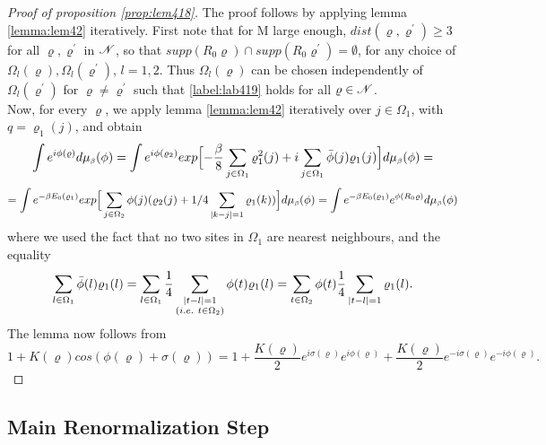 \documentclass[11pt,reqno]{article}
\DeclarePairedDelimiter\abs{\lvert}{\rvert}%
\theoremstyle{definition}
\numberwithin{equation}{section}
\begin{document}
\begin{proof}[Proof of proposition \eqref{prop:lem418}]
The proof follows by applying lemma \eqref{lemma:lem42} iteratively.
First note that for M large enough, $dist(\varrho, \varrho^\prime) \geq 3$ for all $\varrho, \varrho^\prime$ in $\mathscr{N}$, so that $supp(R_0\varrho) \cap supp(R_0\varrho^\prime) = \emptyset$, for any choice of $\Omega_l(\varrho), \Omega_l(\varrho^\prime)$, $l=1,2$. Thus $\Omega_l(\varrho)$ can be chosen independently of $\Omega_l(\varrho^\prime)$ for $\varrho \neq \varrho^\prime$ such that \eqref{label:lab419} holds for all $\varrho \in \mathscr{N}$.\\
Now, for every $\varrho$, we apply lemma \eqref{lemma:lem42} iteratively over $j \in \Omega_1$, with $q=\varrho_1(j)$, and obtain
$$
\int e^{i\phi(\varrho)}d\mu_{\text{\tiny$\beta$}}(\phi) = 
\int e^{i\phi(\varrho_2)}exp \Big[ {-\frac{\beta}{8}\sum_{j \in \Omega_1}\varrho_1^2(j)} + i\sum_{j \in \Omega_1} \bar{\phi}(j)\varrho_1(j)\Big] d\mu_{\text{\tiny$\beta$}}(\phi) = 
$$
$$
=\int e^{-\beta E_0(\varrho_1)} exp \Big[ \sum_{j \in \Omega_2}\phi(j) (\varrho_2(j) + 1/4\sum_{\abs{k-j}=1} \varrho_1(k) )\Big] \mida =
\int e^{-\beta E_0(\varrho_1)}e^{\phi(R_0\varrho)}\mida
$$
where we used the fact that no two sites in $\Omega_1$ are nearest neighbours, and the equality
$$
\sum_{l\in\Omega_1}\bar{\phi}(l)\varrho_1(l) = 
\sum_{l\in\Omega_1} \frac{1}{4} \sum_{\substack{\abs{t-l}=1 \\ (i.e.\ t\in \Omega_2)}} \phi(t)\varrho_1(l) = 
\sum_{t \in \Omega_2} \phi(t) \frac{1}{4} \sum_{\abs{t-l}=1} \varrho_1(l).
$$
The lemma now follows from 
$$
1+K(\varrho)cos(\phi(\varrho) + \sigma(\varrho)) = 
1 + 
\frac{K(\varrho)}{2}e^{i\sigma(\varrho)}e^{i\phi(\varrho)} + 
\frac{K(\varrho)}{2}e^{-i\sigma(\varrho)}e^{-i\phi(\varrho)}.
$$
\end{proof}






\subsection{Main Renormalization Step}
\end{document}
